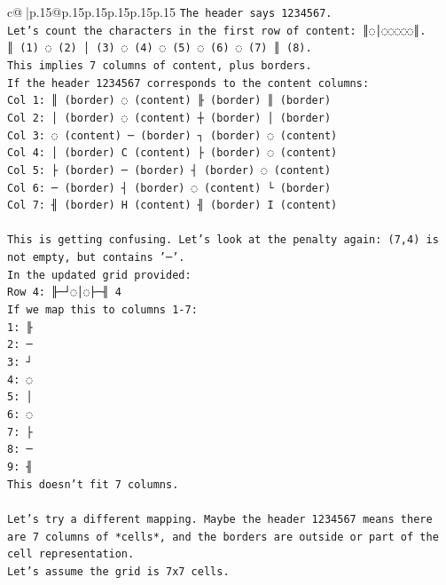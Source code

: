 \documentclass{article}
\begin{document}
{\begin{supertabular}{c@{$\;$}|p{.15\linewidth}@{}p{.15\linewidth}p{.15\linewidth}p{.15\linewidth}p{.15\linewidth}p{.15\linewidth}}
{{{\texttt{The header says 1234567.} \\
\texttt{Let's count the characters in the first row of content: ║◌│◌◌◌◌◌║.} \\
\texttt{║ (1) ◌ (2) │ (3) ◌ (4) ◌ (5) ◌ (6) ◌ (7) ║ (8).} \\
\texttt{This implies 7 columns of content, plus borders.} \\
\texttt{If the header 1234567 corresponds to the content columns:} \\
\texttt{Col 1: ║ (border) ◌ (content) ╟ (border) ║ (border)} \\
\texttt{Col 2: │ (border) ◌ (content) ┼ (border) │ (border)} \\
\texttt{Col 3: ◌ (content) ─ (border) ┐ (border) ◌ (content)} \\
\texttt{Col 4: │ (border) C (content) ├ (border) ◌ (content)} \\
\texttt{Col 5: ├ (border) ─ (border) ┤ (border) ◌ (content)} \\
\texttt{Col 6: ─ (border) ┤ (border) ◌ (content) └ (border)} \\
\texttt{Col 7: ╢ (border) H (content) ╢ (border) I (content)} \\
\\ 
\texttt{This is getting confusing. Let's look at the penalty again: (7,4) is not empty, but contains '─'.} \\
\texttt{In the updated grid provided:} \\
\texttt{Row 4: ╟─┘◌│◌├─╢ 4} \\
\texttt{If we map this to columns 1{-}7:} \\
\texttt{1: ╟} \\
\texttt{2: ─} \\
\texttt{3: ┘} \\
\texttt{4: ◌} \\
\texttt{5: │} \\
\texttt{6: ◌} \\
\texttt{7: ├} \\
\texttt{8: ─} \\
\texttt{9: ╢} \\
\texttt{This doesn't fit 7 columns.} \\
\\ 
\texttt{Let's try a different mapping. Maybe the header 1234567 means there are 7 columns of *cells*, and the borders are outside or part of the cell representation.} \\
\texttt{Let's assume the grid is 7x7 cells.} \\
}}}
\end{supertabular}}
\end{document}
